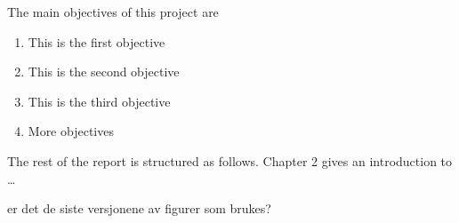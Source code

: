 





The main objectives of this project are
\begin{enumerate}
\item This is the first objective
\item This is the second objective
\item This is the third objective
\item More objectives
\end{enumerate}



The rest of the report is structured as follows. Chapter 2 gives an introduction to \ldots

\todo er det de siste versjonene av figurer som brukes?




